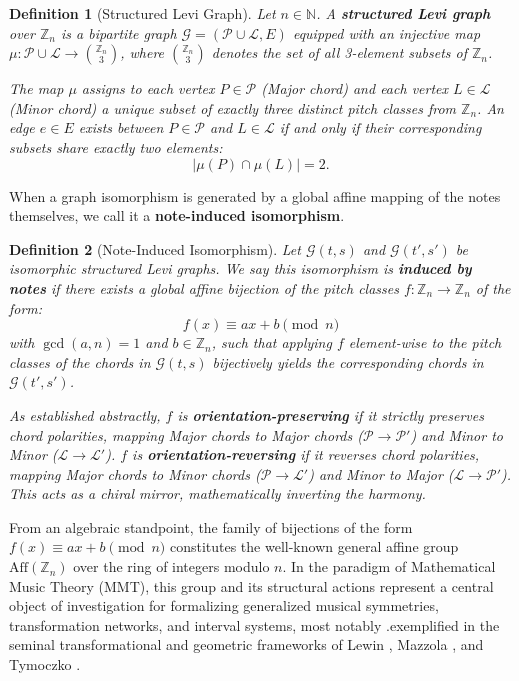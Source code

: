 \documentclass[11pt,letterpaper]{amsart}
\newcommand{\Z}{\mathbb{Z}}
\newtheorem{definition}{Definition}
\begin{document}
\begin{definition}[Structured Levi Graph]
Let $n \in \mathbb{N}$. A \textbf{structured Levi graph} over $\Z_n$ is a bipartite graph $\mathcal{G} = (\mathcal{P} \cup \mathcal{L}, E)$ equipped with an injective map $\mu: \mathcal{P} \cup \mathcal{L} \to \binom{\Z_n}{3}$, where $\binom{\Z_n}{3}$ denotes the set of all 3-element subsets of $\Z_n$. 

The map $\mu$ assigns to each vertex $P \in \mathcal{P}$ (Major chord) and each vertex $L \in \mathcal{L}$ (Minor chord) a unique subset of exactly three distinct pitch classes from $\Z_n$. An edge $e \in E$ exists between $P \in \mathcal{P}$ and $L \in \mathcal{L}$ if and only if their corresponding subsets share exactly two elements:
\begin{equation}
    |\mu(P) \cap \mu(L)| = 2.
\end{equation}
\end{definition}

When a graph isomorphism is generated by a global affine mapping of the notes themselves, we call it a \textbf{note-induced isomorphism}. 

\begin{definition}[Note-Induced Isomorphism]
Let $\mathcal{G}(t,s)$ and $\mathcal{G}(t',s')$ be isomorphic structured Levi graphs. We say this isomorphism is \textbf{induced by notes} if there exists a global affine bijection of the pitch classes $f: \Z_n \to \Z_n$ of the form:
\begin{equation}
    f(x) \equiv ax + b \pmod{n}
\end{equation}
with $\gcd(a,n)=1$ and $b \in \Z_n$, such that applying $f$ element-wise to the pitch classes of the chords in $\mathcal{G}(t,s)$ bijectively yields the corresponding chords in $\mathcal{G}(t',s')$. 

As established abstractly, $f$ is \textbf{orientation-preserving} if it strictly preserves chord polarities, mapping Major chords to Major chords ($\mathcal{P} \to \mathcal{P}'$) and Minor to Minor ($\mathcal{L} \to \mathcal{L}'$). 
$f$ is \textbf{orientation-reversing} if it reverses chord polarities, mapping Major chords to Minor chords ($\mathcal{P} \to \mathcal{L}'$) and Minor to Major ($\mathcal{L} \to \mathcal{P}'$). This acts as a chiral mirror, mathematically inverting the harmony.
\end{definition}


From an algebraic standpoint, the family of bijections of the form $f(x) \equiv ax + b \pmod{n}$ constitutes the well-known general affine group $\text{Aff}(\Z_n)$ over the ring of integers modulo $n$. In the paradigm of Mathematical Music Theory (MMT), this group and its structural actions represent a central object of investigation for formalizing generalized musical symmetries, transformation networks, and interval systems, most notably .exemplified in the seminal transformational and geometric frameworks of Lewin \cite{lewin}, Mazzola \cite{mazzola}, and Tymoczko \cite{tymoczko_geometry}.
\end{document}
